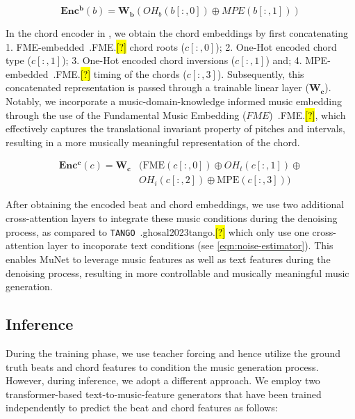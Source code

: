 \documentclass[11pt]{article}
\let\realcite\cite
\renewcommand{\cite}[1]{\ifx.#1.\hl{[?]}\else\realcite{#1}\fi}
\begin{document}
\begin{equation}\label{eq:beat_enc}
    \boldsymbol{Enc^b}(b) = \boldsymbol{W_b} (OH_b(b[:, 0])\oplus MPE(b[:, 1]))
\end{equation}




In the chord encoder in , we obtain the chord embeddings by first concatenating 1. FME-embedded~\cite{FME} chord roots ($c[:, 0]$); 2. One-Hot encoded chord type ($c[:, 1]$); 3. One-Hot encoded chord inversions ($c[:, 1]$) and; 4. MPE-embedded~\cite{FME} timing of the chords ($c[:, 3]$). Subsequently, this concatenated representation is passed through a trainable linear layer ($\boldsymbol{W_c}$). Notably, we incorporate a music-domain-knowledge informed music embedding through the use of the Fundamental Music Embedding ($FME$)~\cite{FME}, which effectively captures the translational invariant property of pitches and intervals, resulting in a more musically meaningful representation of the chord. 

\begin{align}
\label{eq:chord_enc}
\boldsymbol{Enc^c}(c) = \boldsymbol{W_c}&(\text{FME}(c[:, 0]) \oplus OH_t(c[:, 1]) \oplus \nonumber \\
&OH_i(c[:, 2]) \oplus \text{MPE}(c[:, 3]))
\end{align} 

After obtaining the encoded beat and chord embeddings, we use two additional cross-attention layers to integrate these music conditions during the denoising process, as compared to \texttt{TANGO}~\cite{ghosal2023tango} which only use one cross-attention layer to incoporate text conditions (see \cref{eqn:noise-estimator}). This enables MuNet to leverage music features as well as text features during the denoising process, resulting in more controllable and musically meaningful music generation.




\subsection{Inference}
During the training phase, we use teacher forcing and hence utilize the ground truth beats and chord features to condition the music generation process. However, during inference, we adopt a different approach. We employ two transformer-based text-to-music-feature generators that have been trained independently to predict the beat and chord features as follows: 
\end{document}
